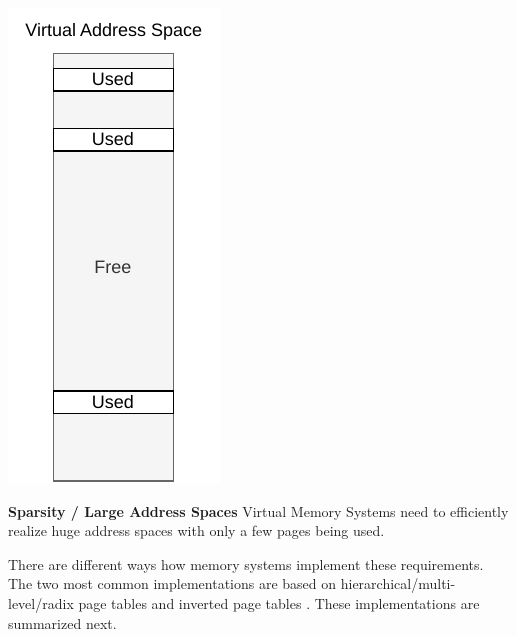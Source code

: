 \begin{marginfigure}
    \centering
    \includegraphics*[width=0.5\marginparwidth]{figures/fund_sparsity.pdf}
    \caption{\textbf{Sparsity / Large Address Spaces} Virtual Memory Systems need to efficiently
        realize huge address spaces with only a few pages being used.}
\end{marginfigure}


There are different ways how memory systems implement these requirements.
The two most common implementations are based on hierarchical/multi-level/radix
\cite{jacob1998virtualissues,yaniv2016hash,tanenbaumOS} page tables and inverted page tables \cite{jacob1998look,jacob1998virtualissues}.
These implementations are summarized next.





